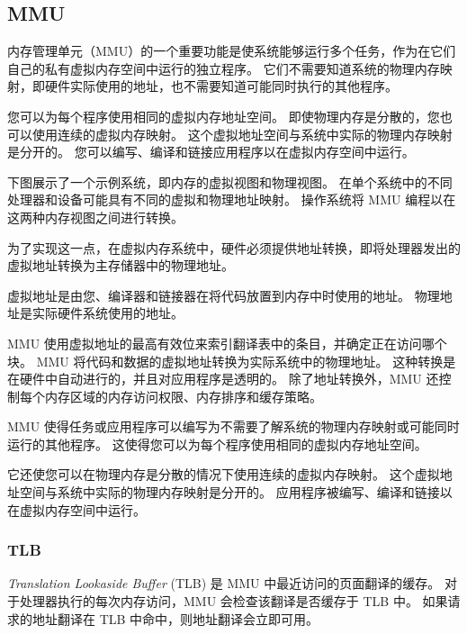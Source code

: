 \subsection{MMU}

内存管理单元（MMU）的一个重要功能是使系统能够运行多个任务，作为在它们自己的私有虚拟内存空间中运行的独立程序。
它们不需要知道系统的物理内存映射，即硬件实际使用的地址，也不需要知道可能同时执行的其他程序。


您可以为每个程序使用相同的虚拟内存地址空间。
即使物理内存是分散的，您也可以使用连续的虚拟内存映射。
这个虚拟地址空间与系统中实际的物理内存映射是分开的。
您可以编写、编译和链接应用程序以在虚拟内存空间中运行。

下图展示了一个示例系统，即内存的虚拟视图和物理视图。
在单个系统中的不同处理器和设备可能具有不同的虚拟和物理地址映射。
操作系统将 MMU 编程以在这两种内存视图之间进行转换。


为了实现这一点，在虚拟内存系统中，硬件必须提供地址转换，即将处理器发出的虚拟地址转换为主存储器中的物理地址。

虚拟地址是由您、编译器和链接器在将代码放置到内存中时使用的地址。
物理地址是实际硬件系统使用的地址。

MMU 使用虚拟地址的最高有效位来索引翻译表中的条目，并确定正在访问哪个块。
MMU 将代码和数据的虚拟地址转换为实际系统中的物理地址。
这种转换是在硬件中自动进行的，并且对应用程序是透明的。
除了地址转换外，MMU 还控制每个内存区域的内存访问权限、内存排序和缓存策略。


MMU 使得任务或应用程序可以编写为不需要了解系统的物理内存映射或可能同时运行的其他程序。
这使得您可以为每个程序使用相同的虚拟内存地址空间。

它还使您可以在物理内存是分散的情况下使用连续的虚拟内存映射。
这个虚拟地址空间与系统中实际的物理内存映射是分开的。
应用程序被编写、编译和链接以在虚拟内存空间中运行。

\subsubsection{TLB}

\textit{Translation Lookaside Buffer} (TLB) 是 MMU 中最近访问的页面翻译的缓存。
对于处理器执行的每次内存访问，MMU 会检查该翻译是否缓存于 TLB 中。
如果请求的地址翻译在 TLB 中命中，则地址翻译会立即可用。

